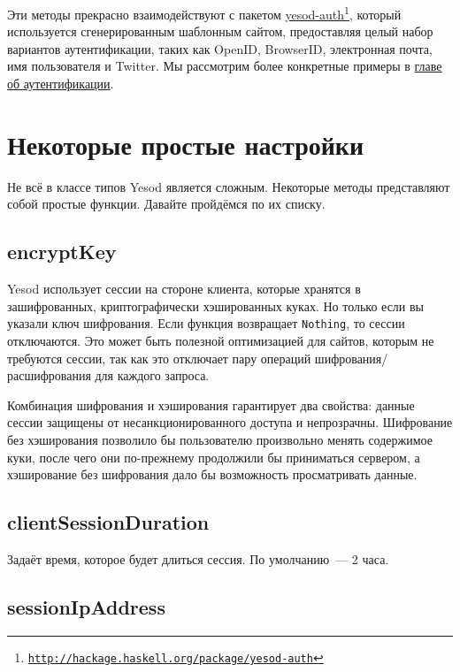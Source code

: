 Эти методы прекрасно взаимодействуют с пакетом \href{http://hackage.haskell.org/package/yesod-auth}{yesod-auth}\footnote{\href{http://hackage.haskell.org/package/yesod-auth}{\texttt{http://hackage.haskell.org/package/yesod-auth}}}, который используется сгенерированным шаблонным сайтом, предоставляя целый набор вариантов аутентификации, таких как OpenID, BrowserID, электронная почта, имя пользователя и Twitter. Мы рассмотрим более конкретные примеры в \hyperref[chap:auth]{главе об аутентификации}.

\section {Некоторые простые настройки}

Не всё в классе типов Yesod является сложным. Некоторые методы представляют собой простые функции. Давайте пройдёмся по их списку.

\subsection {encryptKey}

Yesod использует сессии на стороне клиента, которые хранятся в зашифрованных, криптографически хэшированных куках. Но только если вы указали ключ шифрования. Если функция возвращает \lstinline!Nothing!, то сессии отключаются. Это может быть полезной оптимизацией для сайтов, которым не требуются сессии, так как это отключает пару операций шифрования/расшифрования для каждого запроса.

\begin{remark}
Комбинация шифрования и хэширования гарантирует два свойства: данные сессии защищены от несанкционированного доступа и непрозрачны. Шифрование без хэширования позволило бы пользователю произвольно менять содержимое куки, после чего они по-прежнему продолжили бы приниматься сервером, а хэширование без шифрования дало бы возможность просматривать данные.
\end{remark}

\subsection {clientSessionDuration}

Задаёт время, которое будет длиться сессия. По умолчанию~--- 2 часа.

\subsection {sessionIpAddress}

